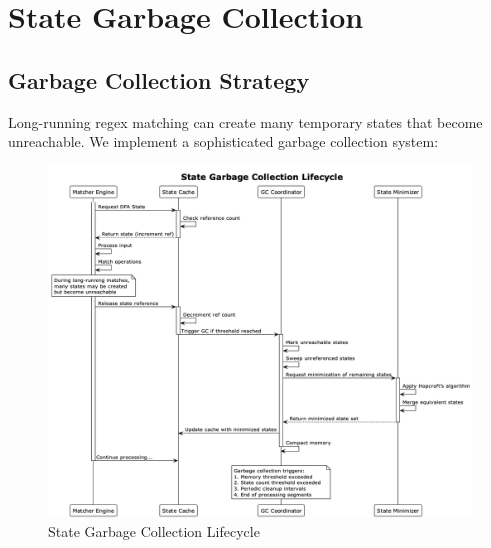 \documentclass[11pt,a4paper]{article}
\begin{document}
\section{State Garbage Collection}

\subsection{Garbage Collection Strategy}

Long-running regex matching can create many temporary states that become unreachable. We implement a sophisticated garbage collection system:

\begin{figure}[H]
\centering
\includegraphics[width=\textwidth]{illustrations/garbage_collection_lifecycle.png}
\caption{State Garbage Collection Lifecycle}
\label{fig:gc_lifecycle}
\end{figure}
\end{document}
